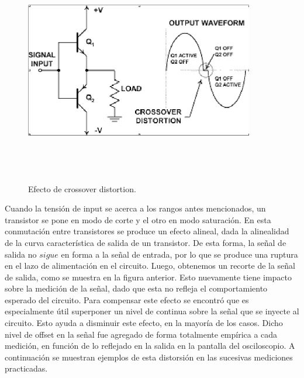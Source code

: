 \begin{figure}[H] %
	\centering
	\includegraphics[width=10cm,height=10cm,keepaspectratio]{../EJ1/00GRAFICOS/cross.png}
	\caption{Efecto de crossover distortion.}
	\label{cross}
\end{figure}

Cuando la tensi\'on de input se acerca a los rangos antes mencionados, 
un transistor se pone en modo de corte y el otro en modo saturaci\'on. 
En esta conmutaci\'on entre transistores se produce un efecto alineal, 
dada la alinealidad de la curva característica de salida de un transistor. 
De esta forma, la señal de salida no $sigue$ en forma a la se\~nal de entrada, 
por lo que se produce una ruptura en el lazo de alimentación en el circuito. 
Luego, obtenemos un recorte de la señal de salida, como se muestra en la figura anterior. 
Esto nuevamente tiene impacto sobre la medici\'on de la señal, dado que esta no refleja 
el comportamiento esperado del circuito. Para compensar este efecto se encontró que es 
especialmente \'util superponer un nivel de continua sobre la señal que se inyecte al circuito. 
Esto ayuda a disminuir este efecto, en la mayor\'ia de los casos. Dicho nivel de offset en la se\~nal fue agregado de forma totalmente empírica a cada medición, en función de lo reflejado en la salida en la pantalla del osciloscopio.
A continuación se muestran ejemplos de esta distorsi\'on en las sucesivas mediciones practicadas.


